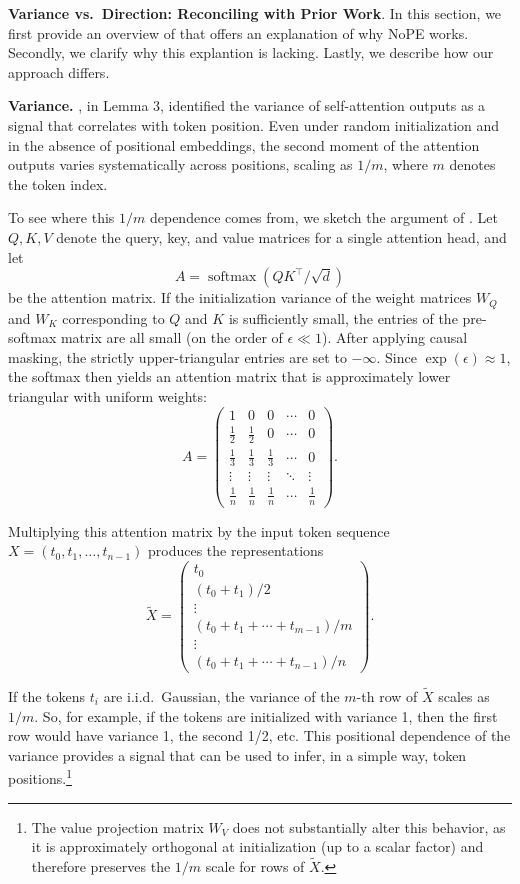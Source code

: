 \documentclass{article}
\theoremstyle{plain}
\theoremstyle{definition}
\theoremstyle{remark}
\begin{document}
\textbf{Variance vs.\ Direction: Reconciling with Prior Work}. In this section, we first provide an overview of \citet{chi-etal-2023-latent} that offers an explanation of why NoPE works. Secondly,  we clarify why this explantion is lacking. Lastly, we describe how our approach differs. 

\textbf{Variance.} \citet{chi-etal-2023-latent}, in Lemma 3, identified the {variance} of self-attention outputs as a signal that correlates with token position. Even under random initialization and in the absence of positional embeddings, the second moment of the attention outputs varies systematically across positions, scaling as $1/m$, where $m$ denotes the token index.

To see where this $1/m$ dependence comes from, we sketch the argument of \citet{chi-etal-2023-latent}. Let $Q, K, V$ denote the query, key, and value matrices for a single attention head, and let
\[
A = \operatorname{softmax}(QK^\top / \sqrt{d})
\]
be the attention matrix. If the initialization variance of the weight matrices $W_Q$ and $W_K$ corresponding to $Q$ and $K$ is sufficiently small, the entries of the pre-softmax matrix are all small (on the order of $\epsilon \ll 1$). After applying causal masking, the strictly upper-triangular entries are set to $-\infty$. Since $\exp(\epsilon) \approx 1$, the softmax then yields an attention matrix that is approximately lower triangular with uniform weights:
\[
A =
\begin{pmatrix}
1 & 0 & 0 & \cdots & 0 \\
\frac12 & \frac12 & 0 & \cdots & 0 \\
\frac13 & \frac13 & \frac13 & \cdots & 0 \\
\vdots & \vdots & \vdots & \ddots & \vdots \\
\frac1n & \frac1n & \frac1n & \cdots & \frac1n
\end{pmatrix}.
\]

Multiplying this attention matrix by the input token sequence
$X = (t_0, t_1, \dots, t_{n-1})$
produces the representations
\[
\tilde{X} =
\begin{pmatrix}
t_0 \\
(t_0 + t_1)/2 \\
\vdots \\
(t_0 + t_1 + \cdots + t_{m-1})/m \\
\vdots \\
(t_0 + t_1 + \cdots + t_{n-1})/n
\end{pmatrix}.
\]

If the tokens $t_i$ are i.i.d.\ Gaussian, the variance of the $m$-th row of $\tilde{X}$ scales as $1/m$. So, for example,  if the tokens are initialized with variance 1, then the first row would have variance 1, the second 1/2, etc.  This positional dependence of the variance provides a signal that can be used to infer, in a simple way, token positions.\footnote{The value projection matrix $W_V$ does not substantially alter this behavior, as it is approximately orthogonal at initialization  (up to a scalar factor) and therefore preserves the $1/m$ scale for rows of $\tilde{X}$.}
\end{document}
